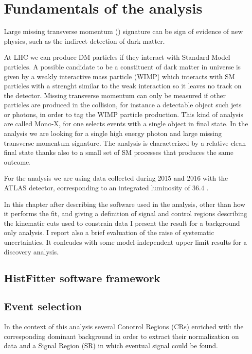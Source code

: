 \chapter{Fundamentals of the \mph analysis}
Large missing transverse momentum (\met) signature can be sign of evidence of new physics, such as the indirect detection of dark matter.

At LHC we can produce DM particles if they interact with Standard Model particles. A possible candidate to be a constituent of dark matter in universe is given by a weakly interactive mass particle (WIMP) which interacts with SM particles with a strenght similar to the weak interaction so it leaves no track on the detector. Missing transverse momentum can only be measured  if other particles are produced in the collision, for instance a detectable object such jets or photons, in order to tag the WIMP particle production. This kind of analysis are called Mono-X, for one selects events with a single object in final state. In the \mph analysis we are looking for a single high energy photon and large missing transverse momentum signature. The \mph analysis is characterized by a relative clean final state thanks also to a small set of SM processes that produces the same outcome.

For the analysis we are using data collected during 2015 and 2016 with the ATLAS detector, corresponding to an integrated luminosity of $36.4$ \ifb.

In this chapter after describing the software used in the analysis, other than how it performs the fit, and giving a definition of signal and control regions describing the kinematic cuts used to constrain data I present the result for a background only analysis. I report also a brief evaluation of the raise of systematic uncertainties. It conlcudes with some model-independent upper limit results for a discovery analysis.

\section{HistFitter software framework}
\lipsum[0]
\lipsum[1]

\section{Event selection}
In the context of this \mph analysis several Conotrol Regions (CRs) enriched with the corresponding dominant background in order to extract their normalization on data and a Signal Region (SR) in which eventual signal could be found.

